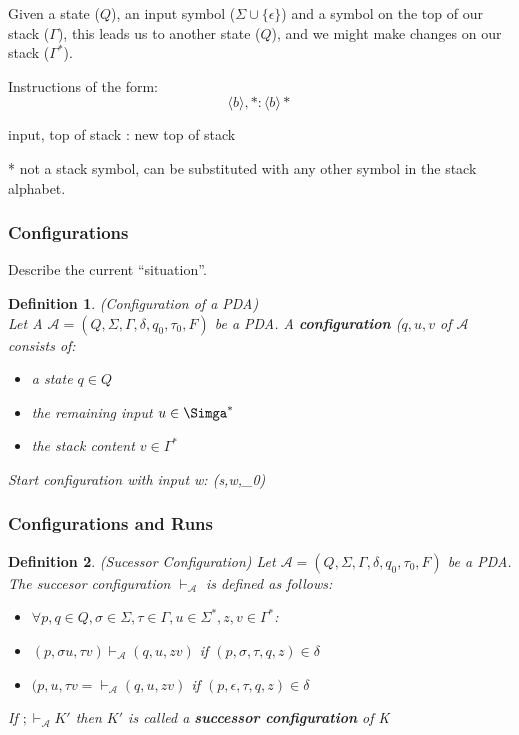 \documentclass[a3paper, 8pt]{extarticle}
\newtheorem*{definition}{Definition}
\begin{document}
\begin{multicols*}{6}
Given a state ($Q$), an input symbol ($\Sigma \cup \{\epsilon\}$) and a symbol on the top of our stack ($\Gamma$), this leads us to another state ($Q$), and we might make changes on our stack ($\Gamma^*$).

Instructions of the form:
$$\langle b \rangle, *: \langle b \rangle*$$
\begin{center}
    input, top of stack : new top of stack
\end{center}

* not a stack symbol, can be substituted with any other symbol in the stack alphabet.

\subsubsection{Configurations}
Describe the current “situation”.

\begin{definition} (Configuration of a PDA)\\
Let A $\mathcal{A}=(Q,\Sigma,\Gamma, \delta, q_0, \tau_0, F)$ be a PDA. A \textbf{configuration} ($q, u, v$ of $\mathcal{A}$ consists of: \begin{itemize}
    \item a state $q \in Q$
    \item the remaining input $u \in \Simga^*$
    \item the stack content $v \in \Gamma^*$
\end{itemize}
Start configuration with input w: (s,w,\tau_0)
\end{definition}

\subsubsection{Configurations and Runs}

\begin{definition} (Sucessor Configuration) Let  $\mathcal{A}=(Q,\Sigma,\Gamma, \delta, q_0, \tau_0, F)$ be a PDA. The succesor configuration $\vdash_\mathcal{A}$ is defined as follows: \begin{itemize}
    \item $\forall p,q \in Q, \sigma \in \Sigma, \tau \in \Gamma, u \in \Sigma^*, z, v \in \Gamma^*$:
    \item $(p, \sigma u, \tau v) \vdash_\mathcal{A}(q, u, zv)$ if $(p, \sigma, \tau, q, z) \in \delta$
    \item $(p, u, \tau v= \vdash_\mathcal{A} (q, u, zv)$ if $(p, \epsilon, \tau, q, z) \in \delta$
\end{itemize}
If $; \vdash_\mathcal{A} K'$ then $K'$ is called a \textbf{successor configuration} of K
\end{definition}


\end{multicols*}
\end{document}
